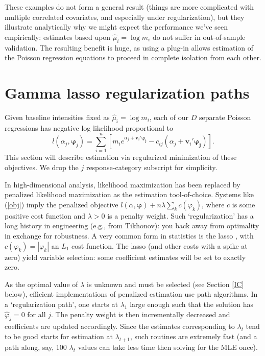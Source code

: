 \documentclass[12pt]{article}
\newcommand{\bs}[1]{\boldsymbol{#1}}
\newcommand{\bm}[1]{\mathbf{#1}}
\begin{document}
These examples do not form a general result (things are more complicated with multiple correlated covariates, and especially under regularization), but they illustrate analytically
why we might expect the performance we've seen empirically: estimates based upon $\hat \mu_i = \log m_i$ do not
suffer in out-of-sample validation. The resulting benefit is huge, as using a
plug-in allows estimation of the Poisson regression equations to proceed in
complete isolation from each other.

\section{Gamma lasso regularization paths}
\label{GL}

Given baseline intensities fixed as $\hat \mu_i = \log m_i$, each of our $D$ separate Poisson
regressions has negative log likelihood proportional to
\begin{equation}\label{obj}
l(\alpha_j, \bs{\varphi}_j) = \sum_{i=1}^n \left[ m_i 
e^{\alpha_j + \bm{v}_i'\bs{\varphi_j}} - c_{ij}(\alpha_j + \bm{v}_i'\bs{\varphi_j})\right].
\end{equation}
This section will describe estimation via regularized minimization of
these objectives. We drop the $j$ response-category subscript for
simplicity.

In high-dimensional analysis, likelihood maximization has been replaced by
penalized likelihood maximization as the estimation tool-of-choice.  Systems
like (\ref{obj}) imply the penalized objective $l(\alpha,\bs{\varphi}) +
n\lambda \sum_k c(\varphi_k)$, where $c$ is some positive cost function and
$\lambda >0$ is a penalty weight.  Such `regularization' has a long history in
engineering (e.g., from Tikhonov): you back away from optimality in exchange
for robustness.  A very common form in statistics is the lasso
\citep{tibshirani_regression_1996}, with $c(\varphi_k) = |\varphi_k|$ an $L_1$
cost function.  The lasso (and other costs with a spike at zero) yield
variable selection: some coefficient estimates will be set to exactly zero.

As the optimal value of $\lambda$ is unknown and must be selected (see Section
\ref{IC} below), efficient implementations of penalized estimation use path
algorithms.  In a `regularization path', one starts at $\lambda_1$ large
enough such that the solution has $\hat\varphi_j=0$ for all $j$.  The penalty
weight is then incrementally decreased and coefficients are updated
accordingly. Since the estimates corresponding to $\lambda_t$ tend to be good
starts for estimation at $\lambda_{t+1}$, such routines are extremely fast
(and a path along, say, 100 $\lambda_t$ values can take less time then solving
for the MLE once).
\end{document}
